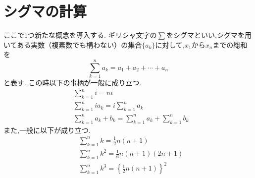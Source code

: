 
\section{シグマの計算}\label{節：シグマの計算}
  ここで1つ新たな概念を導入する.
  ギリシャ文字の$\sum$をシグマといい,シグマを用いてある実数（複素数でも構わない）の集合$\{a_k\}$に対して,$x_1$から$x_n$までの総和を
  \[
    \sum_{k=1}^{n} a_k=a_1+a_2+\cdots+ a_n
  \]
  と表す.
  この時以下の事柄が一般に成り立つ.
  \begin{align*}
    &\sum_{k=1}^{n} i=ni\\
    &\sum_{k=1}^{n} ia_k=i\sum_{k=1}^{n} a_k\\
    &\sum_{k=1}^{n} a_k+b_k=\sum_{k=1}^{n} a_k+\sum_{k=1}^{n} b_k
  \end{align*}
  また,一般に以下が成り立つ.
  \begin{align*}
    &\sum_{k=1}^{n} k=\frac{1}{2}n(n+1)\\
    &\sum_{k=1}^{n} k^2=\frac{1}{6}n(n+1)(2n+1)\\
    &\sum_{k=1}^{n} k^3=\left\{\frac{1}{2}n(n+1)\right\}^2\\
  \end{align*}


